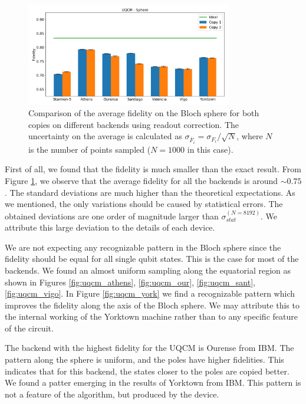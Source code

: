 \begin{figure}[H]
    \centering
            \includegraphics[width=0.8\textwidth]{Figures/UQCM/Histograms/histo_sphere.png}
        
        \caption{Comparison of the average fidelity on the Bloch sphere for both copies on different backends using readout correction. The uncertainty on the average is calculated as $\sigma_{\overline{F}_i}=\sigma_{F_i}/\sqrt{N}$, where $N$ is the number of points sampled ($N=1000$ in this case).}\label{fig:hist_uqcm_sphere}
\end{figure}

First of all, we found that the fidelity is much smaller than the exact result. From Figure \ref{fig:hist_uqcm_sphere}, we observe that the average fidelity for all the backends is around $\sim 0.75$. The standard deviations are much higher than the theoretical expectations. As we mentioned, the only variations should be caused by statistical errors. The obtained deviations are one order of magnitude larger than $\sigma_{stat}^{(N=8192)}$. We attribute this large deviation to the details of each device. 

We are not expecting any recognizable pattern in the Bloch sphere since the fidelity should be equal for all single qubit states. This is the case for most of the backends. We found an almost uniform sampling along the equatorial region as shown in Figures \ref{fig:uqcm_athens}, \ref{fig:uqcm_our}, \ref{fig:uqcm_sant}, \ref{fig:uqcm_vigo}. In Figure \ref{fig:uqcm_york} we find a recognizable pattern which improves the fidelity along the axis of the Bloch sphere. We may attribute this to the internal working of the Yorktown machine rather than to any specific feature of the circuit. 

The backend with the highest fidelity for the UQCM is Ourense from IBM. The pattern along the sphere is uniform, and the poles have higher fidelities. This indicates that for this backend, the states closer to the poles are copied better. We found a patter emerging in the results of Yorktown from IBM. This pattern is not a feature of the algorithm, but produced by the device.

